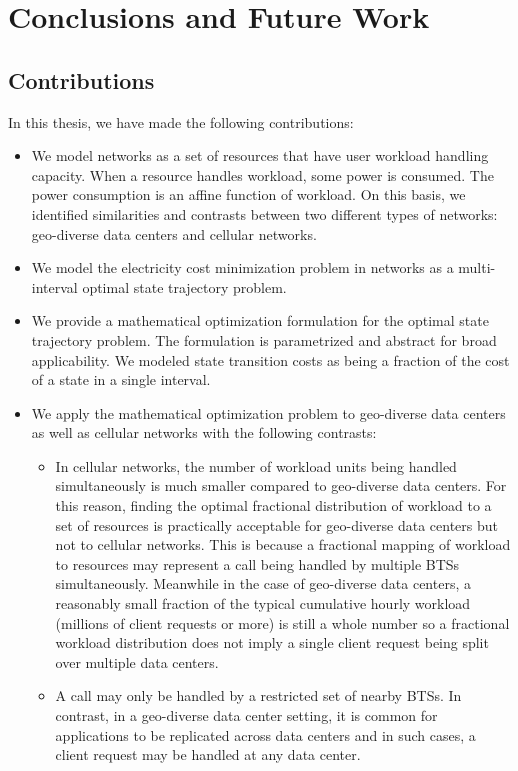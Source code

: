\chapter{Conclusions and Future Work}
\label{chap:conclusions}
\section{Contributions} In this thesis, we have made the following contributions:
\begin{itemize}
\item We model networks as a set of resources that have user workload handling capacity. When a resource handles workload, some power is consumed. The power consumption is an affine function of workload. On this basis, we identified similarities and contrasts between two different types of networks: geo-diverse data centers and cellular networks.
\item We model the electricity cost minimization problem in networks as a multi-interval optimal state trajectory problem.
\item We provide a mathematical optimization formulation for the optimal state trajectory problem. The formulation is parametrized and abstract for broad applicability. We modeled state transition costs as being a fraction of the cost of a state in a single interval.
\item We apply the mathematical optimization problem to geo-diverse data centers as well as cellular networks with the following contrasts:
	\begin{itemize}
	\item In cellular networks, the number of workload units being handled simultaneously is much smaller compared to geo-diverse data centers. For this reason, finding the optimal fractional distribution of workload to a set of resources is practically acceptable for geo-diverse data centers but not to cellular networks. This is because a fractional mapping of workload to resources may represent a call being handled by multiple BTSs simultaneously. Meanwhile in the case of geo-diverse data centers, a reasonably small fraction of the typical cumulative hourly workload (millions of client requests or more) is still a whole number so a fractional workload distribution does not imply a single client request being split over multiple data centers.
	\item A call may only be handled by a restricted set of nearby BTSs. In contrast, in a geo-diverse data center setting, it is common for applications to be replicated across data centers and in such cases, a client request may be handled at any data center.

\end{itemize}
\end{itemize}
